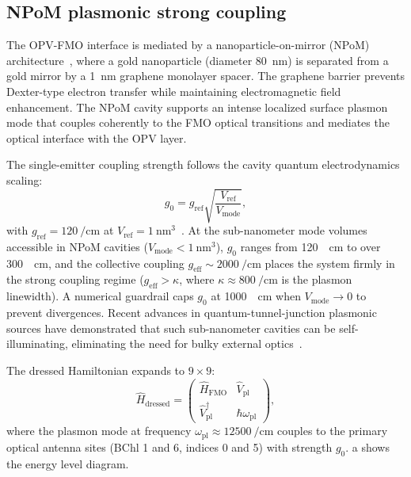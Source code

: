 \documentclass[12pt]{iopart}
\begin{document}
\subsection{NPoM plasmonic strong coupling}

The OPV-FMO interface is mediated by a nanoparticle-on-mirror (NPoM) architecture~\cite{Chikkaraddy2016}, where a gold nanoparticle (diameter \qty{80}{\nm}) is separated from a gold mirror by a \qty{1}{\nm} graphene monolayer spacer.
The graphene barrier prevents Dexter-type electron transfer while maintaining electromagnetic field enhancement.
The NPoM cavity supports an intense localized surface plasmon mode that couples coherently to the FMO optical transitions and mediates the optical interface with the OPV layer.

The single-emitter coupling strength follows the cavity quantum electrodynamics scaling:
\begin{equation}
g_0 = g_{\mathrm{ref}} \sqrt{\frac{V_{\mathrm{ref}}}{V_{\mathrm{mode}}}},
\label{eq:coupling_scaling}
\end{equation}
with $g_{\mathrm{ref}} = \qty{120}{\per\cm}$ at $V_{\mathrm{ref}} = \qty{1}{\nm\cubed}$~\cite{Chikkaraddy2016}.
At the sub-nanometer mode volumes accessible in NPoM cavities ($V_{\mathrm{mode}} < \qty{1}{\nm\cubed}$), $g_0$ ranges from \qty{120}{\per\cm} to over \qty{300}{\per\cm}, and the collective coupling $g_{\mathrm{eff}} \sim \qty{2000}{\per\cm}$ places the system firmly in the strong coupling regime ($g_{\mathrm{eff}} > \kappa$, where $\kappa \approx \qty{800}{\per\cm}$ is the plasmon linewidth).
A numerical guardrail caps $g_0$ at \qty{1000}{\per\cm} when $V_{\mathrm{mode}} \to 0$ to prevent divergences.
Recent advances in quantum-tunnel-junction plasmonic sources have demonstrated that such sub-nanometer cavities can be self-illuminating, eliminating the need for bulky external optics~\cite{Lee2025}.

The dressed Hamiltonian expands to $9\times 9$:
\begin{equation}
\hat{H}_{\mathrm{dressed}} = 
\begin{pmatrix}
\hat{H}_{\mathrm{FMO}} & \hat{V}_{\mathrm{pl}} \\
\hat{V}_{\mathrm{pl}}^{\dagger} & \hbar\omega_{\mathrm{pl}}
\end{pmatrix},
\label{eq:dressed_hamiltonian}
\end{equation}
where the plasmon mode at frequency $\omega_{\mathrm{pl}} \approx \qty{12500}{\per\cm}$ couples to the primary optical antenna sites (BChl 1 and 6, indices 0 and 5) with strength $g_0$.
a shows the energy level diagram.
\end{document}
